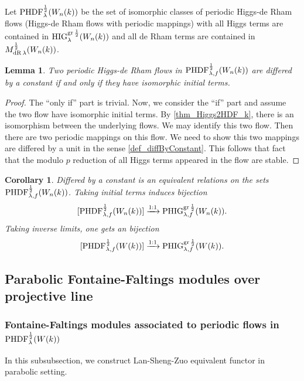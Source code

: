 \documentclass[12pt,twoside]{book}
\theoremstyle{plain}
\newtheorem{lemma}[lemma]{Lemma}
\newtheorem{corollary}[corollary]{Corollary}
\theoremstyle{definition}
\theoremstyle{remark}
\numberwithin{equation}{section}
\def\High{{\mathrm{HIG}^{{\rm gr}\,{1\over 2}}_{\lambda}}}
\def\MdRh{{M^{{1\over 2}}_{{\rm dR}\,\lambda}}}
\def\PHDFh{\mathrm{PHDF}^{{1\over 2}}_{\lambda}}
\def\PHDFhf{\mathrm{PHDF}^{{1\over 2}}_{\lambda,f}}
\def\PHighf{{\mathrm{PHIG}^{{\rm gr}\,{1\over 2}}_{\lambda,f}}}
\begin{document}
Let $\PHDFh(W_n(k))$ be the set of isomorphic classes of periodic Higgs-de Rham flows (Higgs-de Rham flows with periodic mappings) with all Higgs terms are contained in $\High(W_n(k))$ and all de Rham terms are contained in $\MdRh(W_n(k))$.

\begin{lemma}
Two periodic Higgs-de Rham flows in $\PHDFhf(W_n(k))$ are differed by a constant if and only if they have isomorphic initial terms.
\end{lemma}
\begin{proof}
The ``only if'' part is trivial. Now, we consider the ``if'' part and assume the two flow have isomorphic initial terms. By \autoref{thm_Higgs2HDF_k}, there is an isomorphism between the underlying flows. We may identify this two flow. Then there are two periodic mappings on this flow. We need to show this two mappings are differed by a unit in the sense \autoref{def_diffByConstant}. This follows that fact that the modulo $p$ reduction of all Higgs terms appeared in the flow are stable.
\end{proof}

\begin{corollary} \label{mthm_PHDFf2PHIGf}
Differed by a constant is an equivalent relations on the sets $\PHDFhf(W_n(k))$. Taking initial terms induces bijection
\[ [\PHDFhf(W_n(k))] \xrightarrow{1:1} \PHighf(W_n(k)).\]
Taking inverse limits, one gets an bijection
\[ [\PHDFhf(W(k))] \xrightarrow{1:1} \PHighf(W(k)).\]
\end{corollary}

\subsection{Parabolic Fontaine-Faltings modules over projective line}
\subsubsection{Fontaine-Faltings modules associated to periodic flows in $\PHDFh(W(k))$}\label{sec_perHiggs2FFM} \label{sec_PHDF2MF}

In this subsubsection, we construct Lan-Sheng-Zuo equivalent functor in parabolic setting.
\end{document}
